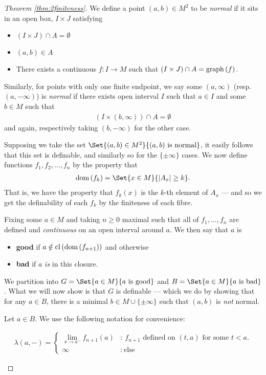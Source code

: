 \begin{proof}[Theorem \ref{thm:2finiteness}]
	We define a point $(a, b) \in M^2$ to be \emph{normal} if it sits in an open box, $I \times J$ satisfying
	\begin{itemize}
		\item $(I \times J) \cap A = \emptyset$
		\item $(a, b) \in A$
		\item There exists a continuous $f \colon I \to M$ such that $(I \times J) \cap A = \operatorname{graph}\left(f\right)$.
	\end{itemize}
	
	Similarly, for points with only one finite endpoint, we say some $(a, \infty)$ (resp. $(a, - \infty)$) is \emph{normal} if there exists open interval $I$ such that $a \in I$ and some $b \in M$ such that 
	\begin{align*}
		(I \times (b, \infty)) \cap A = \emptyset
	\end{align*}
	and again, respectively taking $(b, - \infty)$ for the other case.
	
	Supposing we take the set $\Set{(a, b) \in M^2}{(a, b) \ \textrm{is normal}}$, it easily follows that this set is definable, and similarly so for the $\{\pm \infty\}$ cases. We now define functions $f_1, f_2, \hdots, f_n$ by the property that 
	\begin{align*}
		\dom{f_k} = \Set{x \in M}{\card{A_x} \geq k}.
	\end{align*}
	That is, we have the property that $f_k(x)$ is the $k$-th element of $A_x$ — and so we get the definability of each $f_k$ by the finiteness of each fibre.
	
	Fixing some $a \in M$ and taking $n \geq 0$ maximal such that all of $f_1, \hdots, f_n$ are defined and \emph{continuous} on an open interval around $a$. We then say that $a$ is 
	\begin{itemize}
		\item \textbf{good} if  $a \notin \operatorname{cl}\left(\operatorname{dom}\left(f_{n + 1}\right)\right)$ and otherwise
		\item \textbf{bad} if $a$ \emph{is} in this closure.
	\end{itemize}
	We partition into $G = \Set{a \in M}{a \ \textrm{is good}}$ and $B = \Set{a \in M}{a \ \textrm{is bad}}$. What we will now show is that $G$ is definable — which we do by showing that for any $a \in B$, there is a minimal $b \in M \cup \{\pm \infty \}$ such that $(a, b)$ is \emph{not} normal.
	
	Let $a \in B$. We use the following notation for convenience:
	\begin{description}
		\item  
			\begin{align*}
						\lambda(a, -) = \begin{cases} 
									      \displaystyle\lim_{x \to a^{-}} f_{n + 1}(a) & \colon \ \textrm{$f_{n+1}$ defined on $(t, a)$ for some $t < a$.} \\
									      \infty & \colon \ \textrm{else}
									   \end{cases}
			\end{align*}
			

\end{description}
\end{proof}
